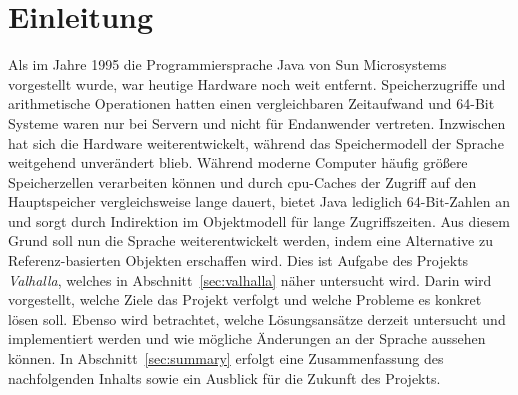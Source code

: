\section{Einleitung}\label{sec:introduction}

Als im Jahre 1995 die Programmiersprache Java von Sun Microsystems vorgestellt wurde, war heutige Hardware noch weit entfernt.
Speicherzugriffe und arithmetische Operationen hatten einen vergleichbaren Zeitaufwand und 64-Bit Systeme waren nur bei Servern und nicht für Endanwender vertreten.
Inzwischen hat sich die Hardware weiterentwickelt, während das Speichermodell der Sprache weitgehend unverändert blieb.
Während moderne Computer häufig größere Speicherzellen verarbeiten können und durch \ac{cpu}-Caches der Zugriff auf den Hauptspeicher vergleichsweise lange dauert, bietet Java lediglich 64-Bit-Zahlen an und sorgt durch Indirektion im Objektmodell für lange Zugriffszeiten.
Aus diesem Grund soll nun die Sprache weiterentwickelt werden, indem eine Alternative zu Referenz-basierten Objekten erschaffen wird.
Dies ist Aufgabe des Projekts \emph{Valhalla}, welches in Abschnitt~\ref{sec:valhalla} näher untersucht wird.
Darin wird vorgestellt, welche Ziele das Projekt verfolgt und welche Probleme es konkret lösen soll.
Ebenso wird betrachtet, welche Lösungsansätze derzeit untersucht und implementiert werden und wie mögliche Änderungen an der Sprache aussehen können.
In Abschnitt~\ref{sec:summary} erfolgt eine Zusammenfassung des nachfolgenden Inhalts sowie ein Ausblick für die Zukunft des Projekts.
